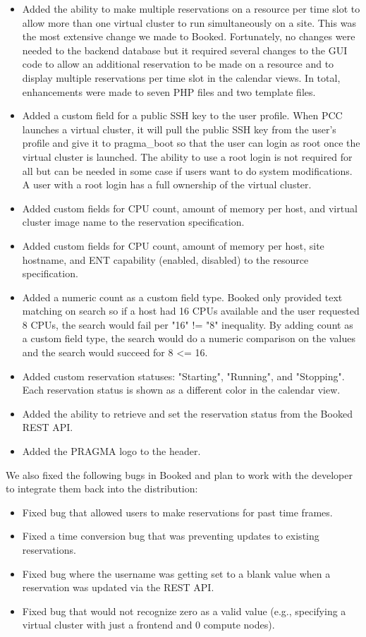 \documentclass[times]{cpeauth}
\begin{document}
\begin{itemize}
\item Added the ability to make multiple reservations on a resource per time slot to allow more than one virtual cluster to run simultaneously on a site.   This was the most extensive change we made to Booked.  Fortunately, no changes were needed to the backend database but it required several changes to the GUI code to allow an additional reservation to be made on a resource and to display multiple reservations per time slot in the calendar views.  In total, enhancements were made to seven PHP files and two template files.
\item Added a custom field for a public SSH key  to the user profile.  When PCC launches a virtual cluster, it will pull the public SSH key from the user's  profile and give it to pragma\_boot so that the user can login as root once the virtual cluster is launched.   The ability to use a root login is not required for all but can be needed in some case if users want to do system modifications. A user with a root login has a full ownership of the virtual cluster. 
\item Added custom fields for CPU count, amount of memory per host, and virtual cluster image name to the reservation specification.
\item Added custom fields for CPU count, amount of memory per host, site hostname, and ENT capability (enabled, disabled) to the resource specification.
\item Added a numeric count as a custom field type.  Booked only provided text matching on search so if a host had 16 CPUs available and the user requested 8 CPUs, the search would fail per "16" != "8" inequality.  By adding count as a custom field type, the search would do a numeric comparison on the values and the search would succeed for 8 <= 16.
\item Added custom reservation statuses: "Starting", "Running", and "Stopping".  Each reservation status is shown as a different color in  the calendar view.
\item Added the ability to retrieve and set the reservation status from the Booked REST API.  	
\item Added the PRAGMA logo to the header.
\end{itemize}

We also fixed the following bugs in Booked and plan to work with the developer to integrate them back into the distribution:

\begin{itemize}
\item Fixed bug that allowed users to make reservations for past time frames.
\item Fixed a time conversion bug that was preventing updates to existing reservations.
\item Fixed bug where the username was getting set to a blank value when a reservation was updated via the REST API. 
\item Fixed bug that would not recognize zero as a valid value (e.g., specifying a virtual cluster with just a frontend and 0 compute nodes).  
\end{itemize}
\end{document}
